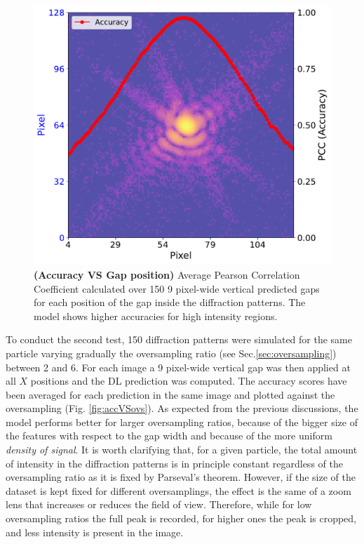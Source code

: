 \begin{figure}[h]
    \centering
    \includegraphics[width=.7\textwidth]{figures/Inpainting/2D_acc_pos.pdf}
    \caption{\textbf{(Accuracy VS Gap position)} Average Pearson Correlation Coefficient calculated over 150 
    9 pixel-wide vertical predicted gaps for each position of the gap inside the diffraction patterns. The model 
    shows higher accuracies for high intensity regions.}
    \label{fig:accVSpos}
\end{figure}

To conduct the second test, 150 diffraction patterns were simulated for the same particle varying gradually the oversampling
ratio (see Sec.\ref{sec:oversampling}) between 2 and 6. For each image a 9 pixel-wide vertical gap was then applied 
at all $X$ positions and the DL prediction was computed. The accuracy scores have been averaged for each prediction 
in the same image and plotted against the oversampling 
(Fig. \ref{fig:accVSovs}). As expected from the previous discussions, the model performs better for larger oversampling ratios, 
because of the bigger size of the features with respect to the gap width and because of the more uniform \textit{density of signal}.
It is worth clarifying that, for a given particle, the total amount of intensity in the
diffraction patterns is in principle constant regardless of the oversampling ratio as it is fixed by Parseval's theorem.
However, if the size of the dataset is kept fixed for different oversamplings, the effect is the same of a zoom lens
that increases or reduces the field of view. Therefore, while for low oversampling ratios the full peak is recorded, 
for higher ones the peak is cropped, and less intensity is present in the image.

